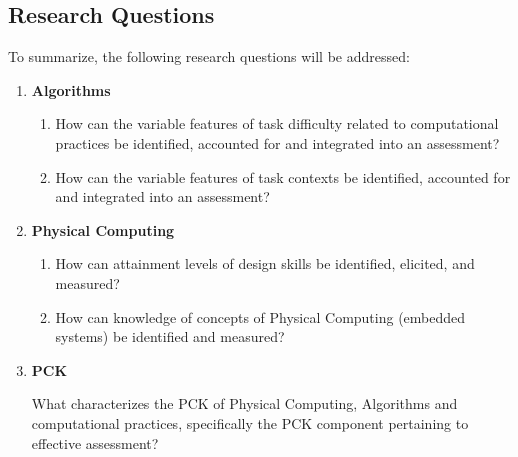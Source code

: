 \subsection*{Research Questions}


To summarize, the following research questions will be addressed:
\begin{enumerate}
\item \textbf{Algorithms}
    \begin{enumerate}
    \item How can the variable features of task difficulty related to computational practices be identified, accounted for and integrated into an assessment?
    \item How can the variable features of task contexts be identified, accounted for and integrated into an assessment?
    \end{enumerate}

\item \textbf{Physical Computing}
    \begin{enumerate}
    \item How can attainment levels of design skills be identified, elicited, and measured?
    \item How can knowledge of concepts of Physical Computing (embedded systems) be identified and measured?
    \end{enumerate}

\item \textbf{PCK}

    What characterizes the PCK of Physical Computing, Algorithms and computational practices, specifically the PCK component pertaining to effective assessment?


\end{enumerate}


%

%
%
%
%

